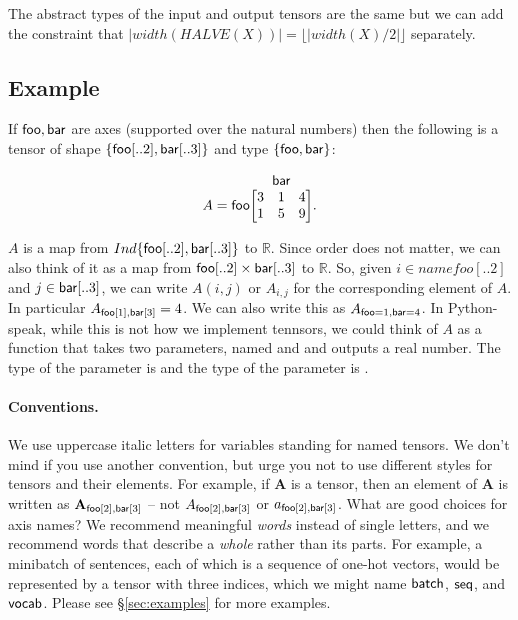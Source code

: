 \documentclass{article}
\makeatletter
\newcommand{\nmatrix}[3]{\name{#1}\begin{array}[b]{@{}c@{}}\name{#2}\\\begin{bmatrix}#3\end{bmatrix}\end{array}}
\makeatother
\begin{document}
The abstract types of the input and output tensors are the same but we can add the constraint that $|width(HALVE(X))|=\lfloor |width(X)/2| \rfloor$ separately.



\subsection{Example}


If $\mathsf{foo}, \mathsf{bar}$ are axes (supported over the natural numbers) then the following is a tensor of shape $\{ \mathsf{foo}[..2], \mathsf{bar}[..3] \}$ and type $\{ \mathsf{foo} , \mathsf{bar} \}$: 

\begin{equation*}
A = \nmatrix{foo}{bar}{
  3 & 1 & 4 \\
  1 & 5 & 9
}.
\end{equation*}


$A$ is a map from $Ind \{ \mathsf{foo}[..2] , \mathsf{bar}[..3] \}$ to $\mathbb{R}$. Since order does not matter, we can also think of it as a map from $\mathsf{foo}[..2] \times \mathsf{bar}[..3]$ to $\mathbb{R}$.
So, given $i \in name{foo}[..2]$ and $j \in \mathsf{bar}[..3]$, we can write $A(i,j)$ or $A_{i,j}$ for the corresponding element of $A$.
In particular $A_{\mathsf{foo}[1],\mathsf{bar}[3]}=4$. We can also write this as $A_{\mathsf{foo}=1,\mathsf{bar}=4}$. In Python-speak, while this is not how we implement tennsors, we could think of $A$ as a function that takes two parameters, named  and  and outputs a real number. The type of the parameter  is  and the type of the parameter  is .



\paragraph{Conventions.}
We use uppercase italic letters for variables standing for named tensors. We don't mind if you use another convention, but urge you not to use different styles for tensors and their elements. For example, if $\mathbf{A}$ is a tensor, then an element of $\mathbf{A}$ is written as $\mathbf{A}_{\mathsf{foo}[2], \mathsf{bar}[3]}$ -- 
not $A_{\mathsf{foo}[2],\mathsf{bar}[3]}$ or $a_{\mathsf{foo}[2],\mathsf{bar}[3]}$.
What are good choices for axis names? We recommend meaningful \emph{words} instead of single letters, and we recommend words that describe a \emph{whole} rather than its parts. For example, a minibatch of sentences, each of which is a sequence of one-hot vectors, would be represented by a tensor with three indices, which we might name $\mathsf{batch}$, $\mathsf{seq}$, and $\mathsf{vocab}$. Please see \S\ref{sec:examples} for more examples.
\end{document}
